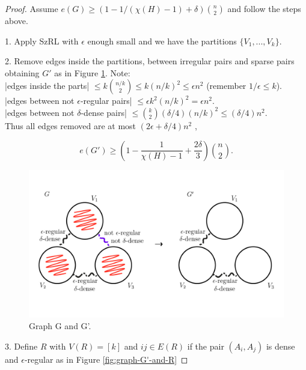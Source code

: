 \documentclass[12pt,twoside,a4paper]{book}
\numberwithin{equation}{section}
\theoremstyle{remark}
\begin{document}
\begin{proof}


Assume $e(G) \geq (1 - 1/(\chi(H) - 1) + \delta)\binom{n}{2}$ and follow the steps above.

1. Apply SzRL with $\epsilon$ enough small and we have the partitions $\{V_1, ... , V_k\}$.

2. Remove edges inside the partitions, between irregular pairs and sparse pairs obtaining $G'$ as in Figure \ref{fig:graph-G-and-G'}.
Note:\\

|edges inside the parts| $\leq k\binom{n/k}{2} \leq k(n/k)^2 \leq \epsilon n^2$ (remember $1/\epsilon \leq k$).\\

|edges between not $\epsilon$-regular pairs| $\leq \epsilon k^2 (n/k)^2 = \epsilon n^2$.\\

|edges between not $\delta$-dense pairs| $\leq \binom{k}{2}(\delta/4) (n/k)^2 \leq (\delta /4)n^2$.\\ 

Thus all edges removed are at most $(2\epsilon + \delta/4)n^2$ , 

$$ e(G') \geq  \left( 1 - \frac{1}{\chi(H) - 1} + \frac{2 \delta}{3}\right) \binom{n}{2}.$$

\begin{figure}[H]
     \centering
     \includegraphics[scale=1.5]{Figuras/graph-G-and-G'.jpg}
     \caption{Graph G and G'.}
     \label{fig:graph-G-and-G'}
\end{figure}

3. Define $R$ with $V(R) = [k]$ and $ij \in E(R) $ if  the pair $(A_i, A_j)$ is dense and $\epsilon$-regular as in Figure \ref{fig:graph-G'-and-R}


\end{proof}
\end{document}
